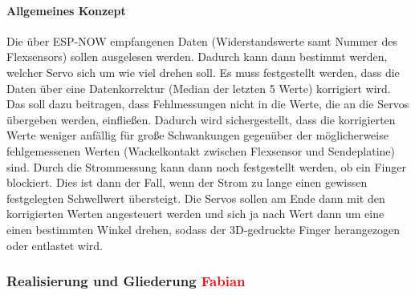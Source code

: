\documentclass[titlepage,12pt,twoside]{article}
\begin{document}
\paragraph{Allgemeines Konzept}
\hfill \break
\hfill \break
Die über ESP-NOW empfangenen Daten (Widerstandswerte samt Nummer des Flexsensors) sollen ausgelesen werden. Dadurch kann dann 
bestimmt werden, welcher Servo sich um wie viel drehen soll. Es muss festgestellt werden, dass die Daten über eine 
Datenkorrektur (Median der letzten 5 Werte) korrigiert wird. Das soll dazu beitragen, dass Fehlmessungen nicht in die Werte, 
die an die Servos übergeben werden, einfließen. Dadurch wird sichergestellt, dass die korrigierten Werte weniger anfällig für 
große Schwankungen gegenüber der möglicherweise fehlgemessenen Werten (Wackelkontakt zwischen Flexsensor und Sendeplatine) sind. 
Durch die Strommessung kann dann noch festgestellt werden, ob ein Finger blockiert. Dies ist dann der Fall, wenn der Strom zu 
lange einen gewissen festgelegten Schwellwert übersteigt. Die Servos sollen am Ende dann mit den korrigierten Werten angesteuert 
werden und sich ja nach Wert dann um eine einen bestimmten Winkel drehen, sodass der 3D-gedruckte Finger herangezogen oder
entlastet wird.
\\

\subsubsection{Realisierung und Gliederung \textcolor{red}{Fabian}}
\end{document}
